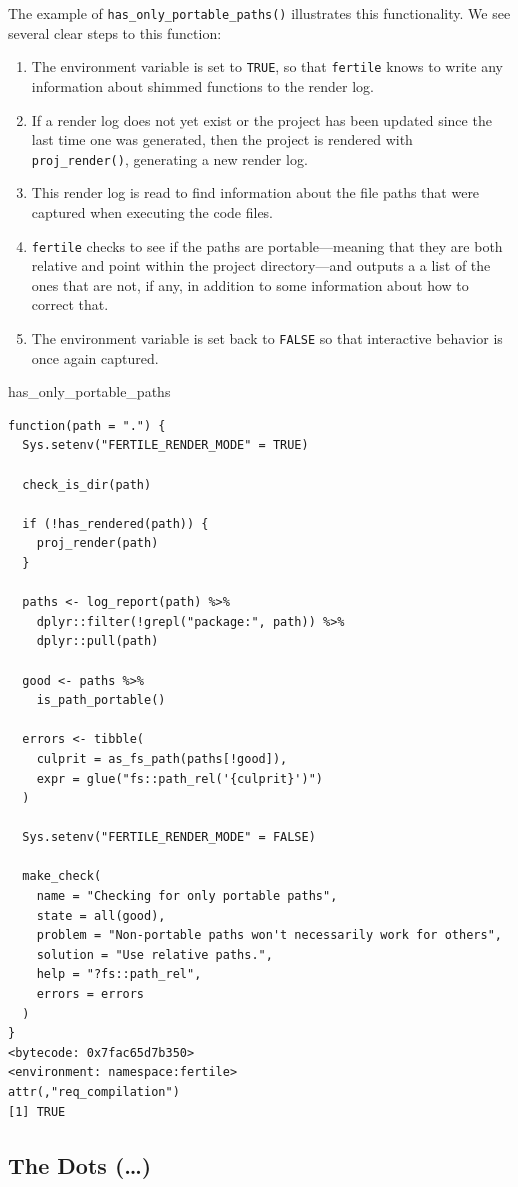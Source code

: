 \documentclass[12pt,twoside]{reedthesis}
\newenvironment{Shaded}{\begin{snugshade}}{\end{snugshade}}
\newcommand{\NormalTok}[1]{#1}
\begin{document}
The example of \texttt{has\_only\_portable\_paths()} illustrates this functionality. We see several clear steps to this function:
\begin{enumerate}
\def\labelenumi{\arabic{enumi}.}
\item
  The environment variable is set to \texttt{TRUE}, so that \texttt{fertile} knows to write any information about shimmed functions to the render log.
\item
  If a render log does not yet exist or the project has been updated since the last time one was generated, then the project is rendered with \texttt{proj\_render()}, generating a new render log.
\item
  This render log is read to find information about the file paths that were captured when executing the code files.
\item
  \texttt{fertile} checks to see if the paths are portable---meaning that they are both relative and point within the project directory---and outputs a a list of the ones that are not, if any, in addition to some information about how to correct that.
\item
  The environment variable is set back to \texttt{FALSE} so that interactive behavior is once again captured.
\end{enumerate}
\begin{Shaded}
\begin{Highlighting}[]
\NormalTok{has\_only\_portable\_paths}
\end{Highlighting}
\end{Shaded}
\begin{verbatim}
function(path = ".") {
  Sys.setenv("FERTILE_RENDER_MODE" = TRUE)

  check_is_dir(path)

  if (!has_rendered(path)) {
    proj_render(path)
  }

  paths <- log_report(path) %>%
    dplyr::filter(!grepl("package:", path)) %>%
    dplyr::pull(path)

  good <- paths %>%
    is_path_portable()

  errors <- tibble(
    culprit = as_fs_path(paths[!good]),
    expr = glue("fs::path_rel('{culprit}')")
  )

  Sys.setenv("FERTILE_RENDER_MODE" = FALSE)

  make_check(
    name = "Checking for only portable paths",
    state = all(good),
    problem = "Non-portable paths won't necessarily work for others",
    solution = "Use relative paths.",
    help = "?fs::path_rel",
    errors = errors
  )
}
<bytecode: 0x7fac65d7b350>
<environment: namespace:fertile>
attr(,"req_compilation")
[1] TRUE
\end{verbatim}
\hypertarget{the-dots}{%
\subsection{The Dots (\ldots)}\label{the-dots}}
\end{document}
